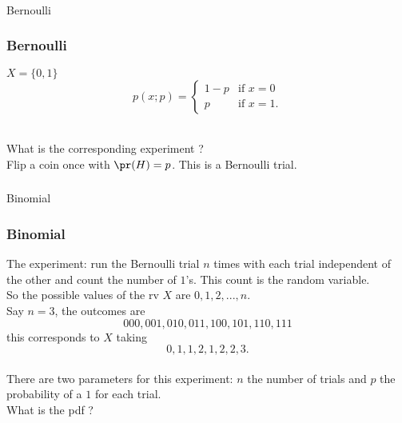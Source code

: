 \begin{frame}[fragile]\frametitle{}
\begin{center}
{\Large Bernoulli}

\end{center}
\end{frame}



\begin{frame}[fragile]\frametitle{Bernoulli}

$X = \{0,1\}$ \\
$$p(x;p) = \left\{\begin{array}{ll}
			1-p & \mbox{if } x =0 \\
			p & \mbox{if } x=1
						   .	\end{array}
						\right. $$ 	 \\ 

\vspace{.1in}

What is the corresponding experiment ?  \\
Flip a coin once with $\pr(H) = p$. This is a Bernoulli trial.


\end{frame}


\begin{frame}[fragile]\frametitle{}
\begin{center}
{\Large Binomial}

\end{center}
\end{frame}


\begin{frame}[fragile]\frametitle{Binomial}

The experiment: run the Bernoulli trial $n$ times with each trial
independent of the other and count the
number of $1$'s. This count is the random variable. \\ 

So the possible values of the rv $X$ are $0,1,2,...,n$. \\ 

Say $n =3$, the outcomes are  
$$000,001,010,011,100,101,110,111$$
this corresponds to $X$ taking
$$0,1,1,2,1,2,2,3.$$  \\

There are two parameters for this experiment: $n$ the number of trials
and $p$ the probability of a $1$ for each trial. \\ 

What is the pdf ?

\end{frame}



